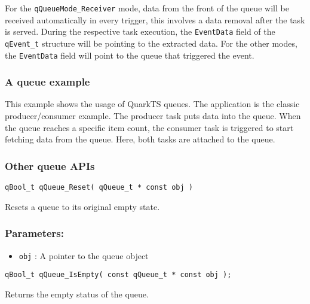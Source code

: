 \begin{tcolorbox}
\HandRight For the \lstinline{qQueueMode_Receiver} mode,  data from the front of the queue will be received automatically in every trigger, this involves a data removal after the task is served. During the respective task execution, the \lstinline{EventData} field of the \lstinline{qEvent_t} structure will be pointing to the extracted data. For the other modes, the \lstinline{EventData} field will point to the queue that triggered the event.
\end{tcolorbox}
    
\subsubsection{A queue example}
This example shows the usage of QuarkTS queues. The application is the classic producer/consumer example. The producer task puts data into the queue. When the queue reaches a specific item count, the consumer task is triggered to start fetching data from the queue. Here, both tasks are attached to the queue. 
\medskip



\subsubsection{Other queue APIs}

\begin{lstlisting}[style=CStyle]
qBool_t qQueue_Reset( qQueue_t * const obj )
\end{lstlisting}

Resets a queue to its original empty state. 

\subsubsection*{Parameters:}
\begin{itemize}
    \item \lstinline{obj} : A pointer to the queue object
\end{itemize}

\noindent\hrulefill


\begin{lstlisting}[style=CStyle]
qBool_t qQueue_IsEmpty( const qQueue_t * const obj );
\end{lstlisting}

Returns the empty status of the queue. 

